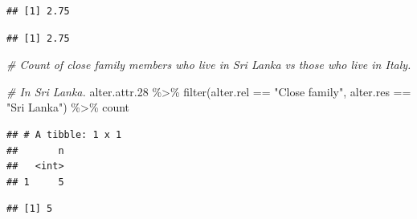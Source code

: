 \documentclass[
]{book}
\newenvironment{Shaded}{\begin{snugshade}}{\end{snugshade}}
\newcommand{\CommentTok}[1]{\textcolor[rgb]{0.56,0.35,0.01}{\textit{#1}}}
\newcommand{\FloatTok}[1]{\textcolor[rgb]{0.00,0.00,0.81}{#1}}
\newcommand{\FunctionTok}[1]{\textcolor[rgb]{0.00,0.00,0.00}{#1}}
\newcommand{\NormalTok}[1]{#1}
\newcommand{\SpecialCharTok}[1]{\textcolor[rgb]{0.00,0.00,0.00}{#1}}
\newcommand{\StringTok}[1]{\textcolor[rgb]{0.31,0.60,0.02}{#1}}
\begin{document}
\begin{verbatim}
## [1] 2.75
\end{verbatim}

\begin{Shaded}
\end{Shaded}

\begin{verbatim}
## [1] 2.75
\end{verbatim}

\begin{Shaded}
\begin{Highlighting}[]
\CommentTok{\# Count of close family members who live in Sri Lanka vs those who live in Italy.}

\CommentTok{\# In Sri Lanka.}
\NormalTok{alter.attr}\FloatTok{.28} \SpecialCharTok{\%\textgreater{}\%}
  \FunctionTok{filter}\NormalTok{(alter.rel }\SpecialCharTok{==} \StringTok{"Close family"}\NormalTok{, alter.res }\SpecialCharTok{==} \StringTok{"Sri Lanka"}\NormalTok{) }\SpecialCharTok{\%\textgreater{}\%}
\NormalTok{  count}
\end{Highlighting}
\end{Shaded}

\begin{verbatim}
## # A tibble: 1 x 1
##       n
##   <int>
## 1     5
\end{verbatim}

\begin{Shaded}
\end{Shaded}

\begin{verbatim}
## [1] 5
\end{verbatim}
\end{document}
